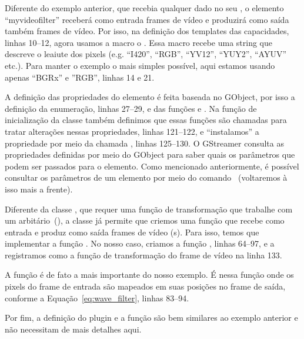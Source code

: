Diferente do exemplo anterior, que recebia qualquer dado no seu ,
o elemento ``myvideofilter'' receberá como entrada frames de vídeo e produzirá
como saída também frames de vídeo.  Por isso, na definição dos templates das
capacidades, linhas 10--12, agora usamos a macro o .
Essa macro recebe uma string que descreve o leaiute dos pixels (e.g. ``I420'',
``RGB'', ``YV12'', ``YUY2'', ``AYUV'' etc.).  Para manter o exemplo o mais
simples possível, aqui estamos usando apenas ``BGRx'' e ''RGB'', linhas 14 e
21.

A definição das propriedades do elemento é feita baseada no 
GObject, por isso a definição da enumeração, linhas 27--29, e das funções
 e .  Na
função de inicialização da classe  também
definimos que essas funções são chamadas para tratar alterações nessas
propriedades, linhas 121--122, e ``instalamos'' a propriedade por meio da
chamada , linhas 125--130.  O GStreamer consulta
as propriedades definidas por meio do GObject para saber quais os parâmetros
que podem ser passados para o elemento.  Como mencionado anteriormente, é
possível consultar os parâmetros de um elemento por meio do comando
~(voltaremos à isso mais a frente).

Diferente da classe , que requer uma função de transformação que
trabalhe com um  arbitário~(), a classe
 já permite que criemos uma função que recebe como entrada e
produz como saída frames de vídeo (s).  Para isso, temos que
implementar a função .  No nosso caso, criamos a função
, linhas 64--97, e a registramos como a função
de transformação do frame de vídeo na linha 133.

A função  é de fato a mais importante do nosso exemplo.
É nessa função onde os pixels do frame de entrada são mapeados em suas posições
no frame de saída, conforme a Equação~\ref{eq:wave_filter}, linhas 83--94.

Por fim, a definição do plugin e a função  são bem
similares ao exemplo anterior e não necessitam de mais detalhes aqui.


